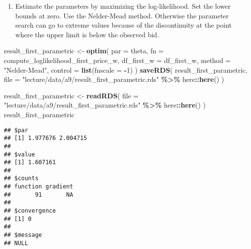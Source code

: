 \documentclass[
]{book}
\newenvironment{Shaded}{\begin{snugshade}}{\end{snugshade}}
\newcommand{\AttributeTok}[1]{\textcolor[rgb]{0.13,0.29,0.53}{#1}}
\newcommand{\DecValTok}[1]{\textcolor[rgb]{0.00,0.00,0.81}{#1}}
\newcommand{\FunctionTok}[1]{\textcolor[rgb]{0.13,0.29,0.53}{\textbf{#1}}}
\newcommand{\NormalTok}[1]{#1}
\newcommand{\OtherTok}[1]{\textcolor[rgb]{0.56,0.35,0.01}{#1}}
\newcommand{\SpecialCharTok}[1]{\textcolor[rgb]{0.81,0.36,0.00}{\textbf{#1}}}
\newcommand{\StringTok}[1]{\textcolor[rgb]{0.31,0.60,0.02}{#1}}
\providecommand{\tightlist}{%
  \setlength{\itemsep}{0pt}\setlength{\parskip}{0pt}}
\begin{document}
\begin{enumerate}
\def\labelenumi{\arabic{enumi}.}
\setcounter{enumi}{8}
\tightlist
\item
  Estimate the parameters by maximizing the log-likelihood. Set the lower bounds at zero. Use the Nelder-Mead method. Otherwise the parameter search can go to extreme values because of the discontinuity at the point where the upper limit is below the observed bid.
\end{enumerate}

\begin{Shaded}
\begin{Highlighting}[]
\NormalTok{result\_first\_parametric }\OtherTok{\textless{}{-}}
  \FunctionTok{optim}\NormalTok{(}
    \AttributeTok{par =}\NormalTok{ theta,}
    \AttributeTok{fn =}\NormalTok{ compute\_loglikelihood\_first\_price\_w,}
    \AttributeTok{df\_first\_w =}\NormalTok{ df\_first\_w,}
    \AttributeTok{method =} \StringTok{"Nelder{-}Mead"}\NormalTok{,}
    \AttributeTok{control =} \FunctionTok{list}\NormalTok{(}\AttributeTok{fnscale =} \SpecialCharTok{{-}}\DecValTok{1}\NormalTok{)}
\NormalTok{  )}
\FunctionTok{saveRDS}\NormalTok{(}
\NormalTok{  result\_first\_parametric,}
  \AttributeTok{file =} \StringTok{"lecture/data/a9/result\_first\_parametric.rds"} \SpecialCharTok{\%\textgreater{}\%}\NormalTok{ here}\SpecialCharTok{::}\FunctionTok{here}\NormalTok{()}
\NormalTok{)}
\end{Highlighting}
\end{Shaded}

\begin{Shaded}
\begin{Highlighting}[]
\NormalTok{result\_first\_parametric }\OtherTok{\textless{}{-}} 
  \FunctionTok{readRDS}\NormalTok{(}
    \AttributeTok{file =} \StringTok{"lecture/data/a9/result\_first\_parametric.rds"} \SpecialCharTok{\%\textgreater{}\%}\NormalTok{ here}\SpecialCharTok{::}\FunctionTok{here}\NormalTok{()}
\NormalTok{  )}
\NormalTok{result\_first\_parametric}
\end{Highlighting}
\end{Shaded}

\begin{verbatim}
## $par
## [1] 1.977676 2.004715
## 
## $value
## [1] 1.607161
## 
## $counts
## function gradient 
##       91       NA 
## 
## $convergence
## [1] 0
## 
## $message
## NULL
\end{verbatim}

\begin{Shaded}
\end{Shaded}
\end{document}

